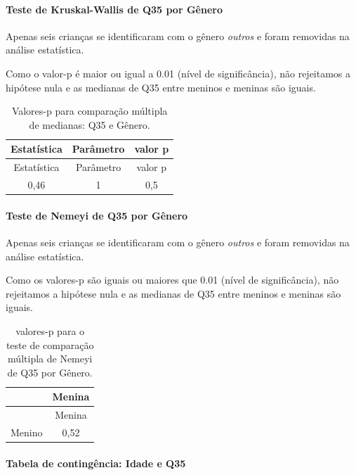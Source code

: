 \documentclass[]{article}
\let\oldparagraph\paragraph
\renewcommand{\paragraph}[1]{\oldparagraph{#1}\mbox{}}
\begin{document}
\hypertarget{teste-de-kruskal-wallis-de-q35-por-guxeanero}{%
\paragraph{Teste de Kruskal-Wallis de Q35 por Gênero}\label{teste-de-kruskal-wallis-de-q35-por-guxeanero}}

Apenas seis crianças se identificaram com o gênero \emph{outros} e foram removidas na análise estatística.

Como o valor-p é maior ou igual a 0.01 (nível de significância), não rejeitamos a hipótese nula e as medianas de Q35 entre meninos e meninas são iguais.

\begin{longtable}[]{@{}ccc@{}}
\caption{\label{tab:unnamed-chunk-1268}Valores-p para comparação múltipla de medianas: Q35 e Gênero.}\tabularnewline
\toprule
Estatística & Parâmetro & valor p\tabularnewline
\midrule
\endfirsthead
\toprule
Estatística & Parâmetro & valor p\tabularnewline
\midrule
\endhead
0,46 & 1 & 0,5\tabularnewline
\bottomrule
\end{longtable}

\hypertarget{teste-de-nemeyi-de-q35-por-guxeanero}{%
\paragraph{Teste de Nemeyi de Q35 por Gênero}\label{teste-de-nemeyi-de-q35-por-guxeanero}}

Apenas seis crianças se identificaram com o gênero \emph{outros} e foram removidas na análise estatística.

Como os valores-p são iguais ou maiores que 0.01 (nível de significância), não rejeitamos a hipótese nula e as medianas de Q35 entre meninos e meninas são iguais.

\begin{longtable}[]{@{}lc@{}}
\caption{\label{tab:unnamed-chunk-1270}valores-p para o teste de comparação múltipla de Nemeyi de Q35 por Gênero.}\tabularnewline
\toprule
& Menina\tabularnewline
\midrule
\endfirsthead
\toprule
& Menina\tabularnewline
\midrule
\endhead
Menino & 0,52\tabularnewline
\bottomrule
\end{longtable}

\cleardoublepage

\hypertarget{tabela-de-continguxeancia-idade-e-q35}{%
\paragraph{Tabela de contingência: Idade e Q35}\label{tabela-de-continguxeancia-idade-e-q35}}
\end{document}
